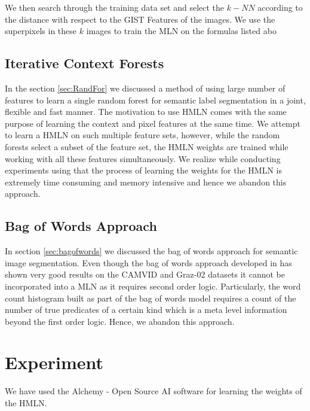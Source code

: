 \documentclass{article} %
\begin{document}
We then search through the training data set and select the $k-NN$ according to the distance with respect to the GIST Features \cite{Gist} of the images. We use the superpixels in these $k$ images to train the MLN on the formulas listed abo

\subsection{Iterative Context Forests}
\label{sec:IterContFor}

In the section \ref{sec:RandFor} we discussed a method of using large number of features to learn a single random forest for semantic label segmentation in a joint, flexible and fast manner. The motivation to use HMLN comes with the same purpose of learning the context and pixel features at the same time. We attempt to learn a HMLN on such multiple feature sets, however, while the random forests select a subset of the feature set, the HMLN weights are trained while working with all these features simultaneously. We realize while conducting experiments using \cite{alchemy} that the process of learning the weights for the HMLN is extremely time consuming and memory intensive and hence we abandon this approach. 

\subsection{Bag of Words Approach}
\label{sec:BofWordApp}

In section \ref{sec:bagofwords} we discussed the bag of words approach for semantic image segmentation. Even though the bag of words approach developed in \cite{visualdictrene} has shown very good results on the CAMVID and Graz-02 \cite{graz02} datasets it cannot be incorporated into a MLN as it requires second order logic. Particularly, the word count histogram built as part of the bag of words model requires a count of the number of true predicates of a certain kind which is a meta level information beyond the first order logic. Hence, we abandon this approach.

\section{Experiment}
\label{sec:Exp}

We have used the Alchemy - Open Source AI software \cite{alchemy} for learning the weights of the HMLN.
\end{document}
